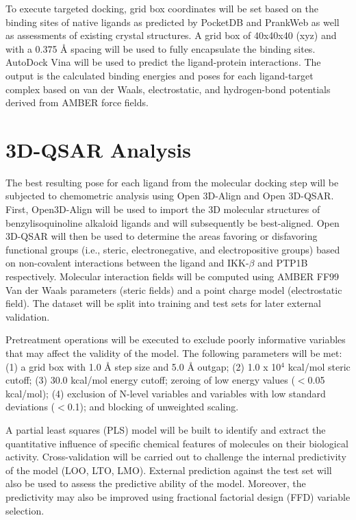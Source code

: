 To execute targeted docking, grid box coordinates will be set based on the binding sites of native ligands as predicted by PocketDB and PrankWeb as well as assessments of existing crystal structures. A grid box of 40x40x40 (xyz) and with a 0.375 \r{A} spacing will be used to fully encapsulate the binding sites. AutoDock Vina will be used to predict the ligand-protein interactions. The output is the calculated binding energies and poses for each ligand-target complex based on van der Waals, electrostatic, and hydrogen-bond potentials derived from AMBER force fields. 

\section{3D-QSAR Analysis}
The best resulting pose for each ligand from the molecular docking step will be subjected to chemometric analysis using Open 3D-Align and Open 3D-QSAR. First, Open3D-Align will be used to import the 3D molecular structures of benzylisoquinoline alkaloid ligands and will subsequently be best-aligned. Open 3D-QSAR will then be used to determine the areas favoring or disfavoring functional groups (i.e., steric, electronegative, and electropositive groups) based on non-covalent interactions between the ligand and IKK-$\beta$ and PTP1B respectively. Molecular interaction fields will be computed using AMBER FF99 Van der Waals parameters (steric fields) and a point charge model (electrostatic field). The dataset will be split into training and test sets for later external validation. 

Pretreatment operations will be executed to exclude poorly informative variables that may affect the validity of the model. The following parameters will be met: (1) a grid box with 1.0 \r{A} step size and 5.0 \r{A} outgap; (2) 1.0 x 10$^4$ kcal/mol steric cutoff; (3) 30.0 kcal/mol energy cutoff; zeroing of low energy values ($<$0.05 kcal/mol); (4) exclusion of N-level variables and variables with low standard deviations ($<$0.1); and blocking of unweighted scaling. 

A partial least squares (PLS) model will be built to identify and extract the quantitative influence of specific chemical features of molecules on their biological activity. Cross-validation will be carried out to challenge the internal predictivity of the model (LOO, LTO, LMO). External prediction against the test set will also be used to assess the predictive ability of the model. Moreover, the predictivity may also be improved using fractional factorial design (FFD) variable selection. 

